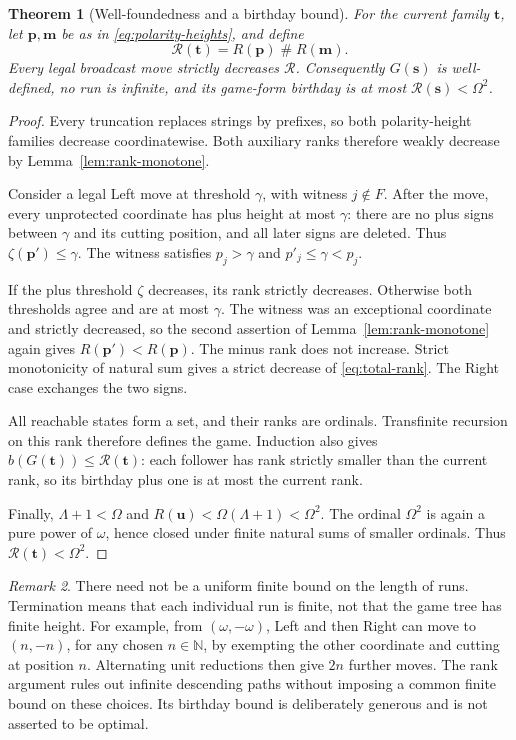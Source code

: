 \documentclass[11pt,letterpaper]{article}
\newtheorem{theorem}{Theorem}[section]
\theoremstyle{definition}
\theoremstyle{remark}
\newtheorem{remark}[theorem]{Remark}
\newcommand{\NN}{\mathbb N}
\newcommand{\bs}{\boldsymbol{s}}
\newcommand{\bt}{\boldsymbol{t}}
\newcommand{\bu}{\boldsymbol{u}}
\newcommand{\ns}{\mathbin{\#}}
\newcommand{\Rk}{\mathcal R}
\begin{document}
\begin{theorem}[Well-foundedness and a birthday bound]\label{thm:rank}
For the current family $\bt$, let $\boldsymbol p,\boldsymbol m$ be as in
\eqref{eq:polarity-heights}, and define
\begin{equation}\label{eq:total-rank}
 \Rk(\bt)=R(\boldsymbol p)\ns R(\boldsymbol m).
\end{equation}
Every legal broadcast move strictly decreases $\Rk$. Consequently
$G(\bs)$ is well-defined, no run is infinite, and its game-form birthday is at
most $\Rk(\bs)<\Omega^2$.
\end{theorem}
\begin{proof}
Every truncation replaces strings by prefixes, so both polarity-height families
decrease coordinatewise. Both auxiliary ranks therefore weakly decrease by
Lemma~\ref{lem:rank-monotone}.

Consider a legal Left move at threshold $\gamma$, with witness $j\notin F$.
After the move, every unprotected coordinate has plus height at most $\gamma$:
there are no plus signs between $\gamma$ and its cutting position, and all later
signs are deleted. Thus $\zeta(\boldsymbol p')\leq\gamma$. The witness satisfies
$p_j>\gamma$ and $p'_j\leq\gamma<p_j$.

If the plus threshold $\zeta$ decreases, its rank strictly decreases. Otherwise
both thresholds agree and are at most $\gamma$. The witness was an exceptional
coordinate and strictly decreased, so the second assertion of
Lemma~\ref{lem:rank-monotone} again gives $R(\boldsymbol p')<R(\boldsymbol p)$.
The minus rank does not increase. Strict monotonicity of natural sum gives a
strict decrease of \eqref{eq:total-rank}. The Right case exchanges the two signs.

All reachable states form a set, and their ranks are ordinals. Transfinite
recursion on this rank therefore defines the game. Induction also gives
$b(G(\bt))\leq\Rk(\bt)$: each follower has rank strictly smaller than the current
rank, so its birthday plus one is at most the current rank.

Finally, $\Lambda+1<\Omega$ and
$R(\bu)<\Omega(\Lambda+1)<\Omega^2$. The ordinal $\Omega^2$ is again a pure power
of $\omega$, hence closed under finite natural sums of smaller ordinals. Thus
$\Rk(\bt)<\Omega^2$.
\end{proof}

\begin{remark}
There need not be a uniform finite bound on the length of runs. Termination
means that each individual run is finite, not that the game tree has finite
height. For example, from $(\omega,-\omega)$, Left and then Right can move to
$(n,-n)$, for any chosen $n\in\NN$, by exempting the other coordinate and
cutting at position $n$. Alternating unit reductions then give $2n$ further
moves. The rank argument rules out infinite descending paths without imposing
a common finite bound on these choices. Its birthday bound is deliberately
generous and is not asserted to be optimal.
\end{remark}
\end{document}
